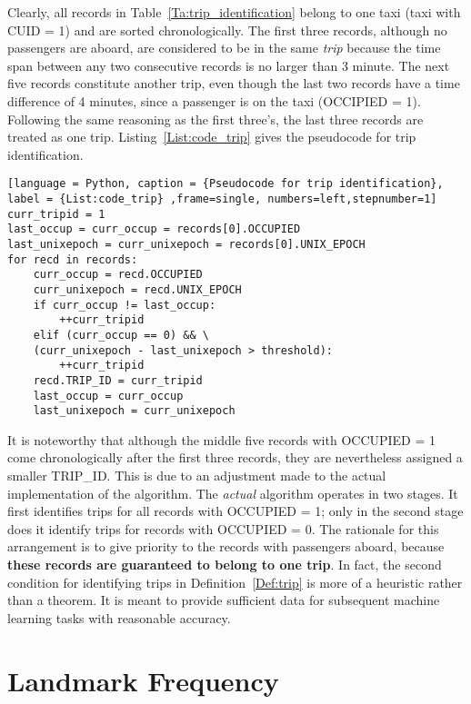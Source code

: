 Clearly, all records in Table~\ref{Ta:trip_identification} belong to one taxi (taxi with CUID = 1) and are sorted chronologically. The first three records, although no passengers are aboard, are considered to be in the same \emph{trip} because the time span between any two consecutive records is no larger than 3 minute. The next five records constitute another trip, even though the last two records have a time difference of 4 minutes, since a passenger is on the taxi (OCCIPIED = 1). Following the same reasoning as the first three's, the last three records are treated as one trip. Listing~\ref{List:code_trip} gives the pseudocode for trip identification.

\begin{lstlisting}[language = Python, caption = {Pseudocode for trip identification}, label = {List:code_trip} ,frame=single, numbers=left,stepnumber=1]
curr_tripid = 1
last_occup = curr_occup = records[0].OCCUPIED
last_unixepoch = curr_unixepoch = records[0].UNIX_EPOCH
for recd in records:
	curr_occup = recd.OCCUPIED
	curr_unixepoch = recd.UNIX_EPOCH
	if curr_occup != last_occup:
		++curr_tripid
	elif (curr_occup == 0) && \
	(curr_unixepoch - last_unixepoch > threshold):
		++curr_tripid
	recd.TRIP_ID = curr_tripid
	last_occup = curr_occup
	last_unixepoch = curr_unixepoch
\end{lstlisting}

It is noteworthy that although the middle five records with OCCUPIED = 1 come chronologically after the first three records, they are nevertheless assigned a smaller TRIP\_ID. This is due to an adjustment made to the actual implementation of the algorithm. The \emph{actual} algorithm operates in two stages. It first identifies trips for all records with OCCUPIED = 1; only in the second stage does it identify trips for records with OCCUPIED = 0. The rationale for this arrangement is to give priority to the records with passengers aboard, because \textbf{these records are guaranteed to belong to one trip}. In fact, the second condition for identifying trips in Definition~\ref{Def:trip} is more of a heuristic rather than a theorem. It is meant to provide sufficient data for subsequent machine learning tasks with reasonable accuracy.

\section{Landmark Frequency}

